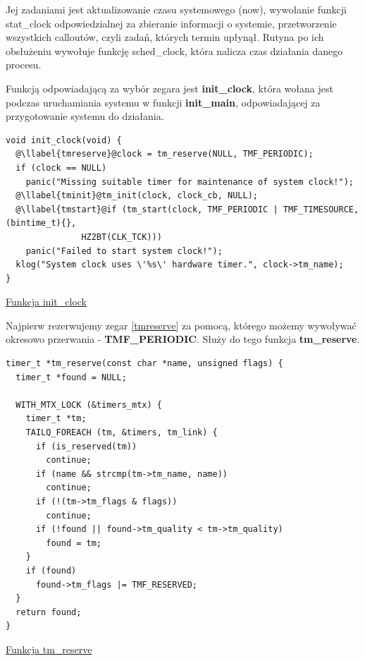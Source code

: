 \documentclass[shortabstract]{iithesis}
\makeatletter
\theoremstyle{definition} \newtheorem*{definition}{Definicja}
\theoremstyle{definition} \newtheorem*{example}{Przykład}
\theoremstyle{definition} \newtheorem*{remark}{Uwaga}
\newenvironment{longlisting}{\captionsetup{type=listing}}{}
\newcounter{llabel}[listing]%
\renewcommand*{\thellabel}{%
    \ifnum\value{llabel}<0 %
      \@ctrerr
    \else
      \ifnum\value{llabel}>10 %
        \@ctrerr
      \else
        \protect\ding{\the\numexpr\value{llabel}+201\relax}%
      \fi
    \fi
  }%
\newlength{\llabelsep}
\newcommand*{\llabel}[1]{%
  \begingroup
  \refstepcounter{llabel}%
  \label{#1}%
  \llap{\thellabel\kern\llabelsep}%
  \endgroup
}
\makeatother
\begin{document}
Jej zadaniami jest aktualizowanie czasu systemowego (now), wywołanie funkcji stat\_clock odpowiedzialnej za zbieranie informacji o systemie, przetworzenie wszystkich calloutów, czyli zadań, których termin upłynął.
Rutyna po ich obsłużeniu wywołuje funkcję sched\_clock, która nalicza czas działania danego procesu.

Funkcją odpowiadającą za wybór zegara jest \textbf{init\_clock}, która wołana jest podczas uruchamiania systemu w funkcji \textbf{init\_main}, odpowiadającej za przygotowanie systemu do działania.

\begin{longlisting}
  \begin{verbatim}
void init_clock(void) {
  @\llabel{tmreserve}@clock = tm_reserve(NULL, TMF_PERIODIC);
  if (clock == NULL)
    panic("Missing suitable timer for maintenance of system clock!");
  @\llabel{tminit}@tm_init(clock, clock_cb, NULL);
  @\llabel{tmstart}@if (tm_start(clock, TMF_PERIODIC | TMF_TIMESOURCE, (bintime_t){},
               HZ2BT(CLK_TCK)))
    panic("Failed to start system clock!");
  klog("System clock uses \'%s\' hardware timer.", clock->tm_name);
}
  \end{verbatim}
  \caption{\href{https://mimiker.ii.uni.wroc.pl/source/xref/mimiker/sys/kern/clock.c?r=039f8f3e\#28}{Funkcja init\_clock}}
  \label{lst:funcinitclock}
\end{longlisting}

Najpierw rezerwujemy zegar \ref{tmreserve} za pomocą, którego możemy wywoływać okresowo przerwania - \textbf{TMF\_PERIODIC}. Służy do tego funkcja \textbf{tm\_reserve}.

\begin{longlisting}
  \begin{verbatim}
timer_t *tm_reserve(const char *name, unsigned flags) {
  timer_t *found = NULL;

  WITH_MTX_LOCK (&timers_mtx) {
    timer_t *tm;
    TAILQ_FOREACH (tm, &timers, tm_link) {
      if (is_reserved(tm))
        continue;
      if (name && strcmp(tm->tm_name, name))
        continue;
      if (!(tm->tm_flags & flags))
        continue;
      if (!found || found->tm_quality < tm->tm_quality)
        found = tm;
    }
    if (found)
      found->tm_flags |= TMF_RESERVED;
  }
  return found;
}
  \end{verbatim}
  \caption{\href{https://mimiker.ii.uni.wroc.pl/source/xref/mimiker/sys/kern/timer.c?r=3547949d\#75}{Funkcja tm\_reserve}}
  \label{lst:functmreserve}
\end{longlisting}
\end{document}
